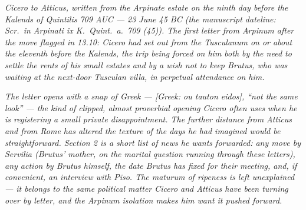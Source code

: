 
\textit{Cicero to Atticus, written from the Arpinate
estate on the ninth day before the Kalends of Quintilis
709 AUC --- 23 June 45 BC (the manuscript dateline:
\textit{Scr.\ in Arpinati ix K.\ Quint.\ a.\ 709 (45)}).
The first letter from Arpinum after the move flagged in
13.10: Cicero had set out from the Tusculanum on or
about the eleventh before the Kalends, the trip being
forced on him both by the need to settle the rents of
his small estates and by a wish not to keep Brutus, who
was waiting at the next-door Tusculan villa, in
perpetual attendance on him.}

\textit{The letter opens with a snap of Greek ---
\textit{[Greek: ou tauton eidos]}, ``not the same
look'' --- the kind of clipped, almost proverbial
opening Cicero often uses when he is registering a
small private disappointment. The further distance from
Atticus and from Rome has altered the texture of the
days he had imagined would be straightforward. Section 2
is a short list of news he wants forwarded: any move by
Servilia (Brutus' mother, on the marital question
running through these letters), any action by Brutus
himself, the date Brutus has fixed for their meeting,
and, if convenient, an interview with Piso. The
\textit{maturum} of ripeness is left unexplained --- it
belongs to the same political matter Cicero and Atticus
have been turning over by letter, and the Arpinum
isolation makes him want it pushed forward.}
